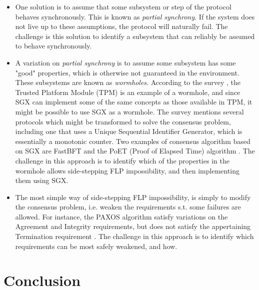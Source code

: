 \documentclass[12pt]{article}
\begin{document}
		\begin{itemize}
			\item One solution is to assume that some subsystem or step of the protocol behaves synchronously. This is known as \textit{partial synchrony}. If the system does not live up to these assumptions, the protocol will naturally fail. The challenge is this solution to identify a subsystem that can reliably be assumed to behave synchronously. 
			\item A variation on \textit{partial synchrony} is to assume some subsystem has some "good" properties, which is otherwise not guaranteed in the environment. These subsystems are known as \textit{wormholes}. According to the survey \cite{consensus-survey}, the Trusted Platform Module (TPM) is an example of a wormhole, and since SGX can implement some of the same concepts as those available in TPM, it might be possible to use SGX as a wormhole. The survey mentions several protocols which might be transformed to solve the consensus problem, including one that uses a Unique Sequential Identifier Generator, which is essentially a monotonic counter. Two examples of consensus algorithm based on SGX are FastBFT \cite{fastbft} and the PoET (Proof of Elapsed Time) algorithm \cite{poet}. The challenge in this approach is to identify which of the properties in the wormhole allows side-stepping FLP impossibility, and then implementing them using SGX.
			\item The most simple way of side-stepping FLP impossibility, is simply to modify the consensus problem, i.e. weaken the requirements s.t. some failures are allowed. For instance, the PAXOS algorithm \cite{paxos} satisfy variations on the Agreement and Integrity requirements, but does not satisfy the appertaining Termination requirement \cite{fast-byz-cons}. The challenge in this approach is to identify which requirements can be most safely weakened, and how.
		\end{itemize}
		
	\section{Conclusion}
\end{document}
